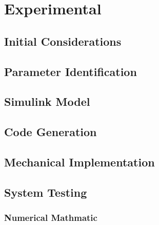 \chapter{Experimental}
\label{experimental}

\section{Initial Considerations}

\section{Parameter Identification}

\section{Simulink Model}

\section{Code Generation}

\section{Mechanical Implementation}

\section{System Testing}
\subsection{Numerical Mathmatic}
\subsection{}





